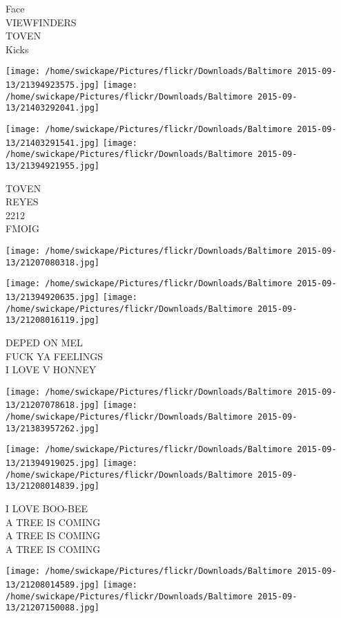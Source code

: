 \documentclass[10pt,letterpaper]{article}
\begin{document}
Face\\
VIEWFINDERS\\
TOVEN\\
Kicks\\
\pagebreak

\texttt{[image: /home/swickape/Pictures/flickr/Downloads/Baltimore 2015-09-13/21394923575.jpg]}
\texttt{[image: /home/swickape/Pictures/flickr/Downloads/Baltimore 2015-09-13/21403292041.jpg]}

\texttt{[image: /home/swickape/Pictures/flickr/Downloads/Baltimore 2015-09-13/21403291541.jpg]}
\texttt{[image: /home/swickape/Pictures/flickr/Downloads/Baltimore 2015-09-13/21394921955.jpg]}

TOVEN\\
REYES\\
2212\\
FMOIG\\
\pagebreak

\texttt{[image: /home/swickape/Pictures/flickr/Downloads/Baltimore 2015-09-13/21207080318.jpg]}

\vspace{0.25in}
\texttt{[image: /home/swickape/Pictures/flickr/Downloads/Baltimore 2015-09-13/21394920635.jpg]}
\texttt{[image: /home/swickape/Pictures/flickr/Downloads/Baltimore 2015-09-13/21208016119.jpg]}

DEPED ON MEL\\
FUCK YA FEELINGS\\
I LOVE V HONNEY\\
\pagebreak

\texttt{[image: /home/swickape/Pictures/flickr/Downloads/Baltimore 2015-09-13/21207078618.jpg]}
\texttt{[image: /home/swickape/Pictures/flickr/Downloads/Baltimore 2015-09-13/21383957262.jpg]}

\texttt{[image: /home/swickape/Pictures/flickr/Downloads/Baltimore 2015-09-13/21394919025.jpg]}
\texttt{[image: /home/swickape/Pictures/flickr/Downloads/Baltimore 2015-09-13/21208014839.jpg]}

I LOVE BOO{-}BEE\\
A TREE IS COMING\\
A TREE IS COMING\\
A TREE IS COMING\\
\pagebreak

\texttt{[image: /home/swickape/Pictures/flickr/Downloads/Baltimore 2015-09-13/21208014589.jpg]}
\texttt{[image: /home/swickape/Pictures/flickr/Downloads/Baltimore 2015-09-13/21207150088.jpg]}
\end{document}
